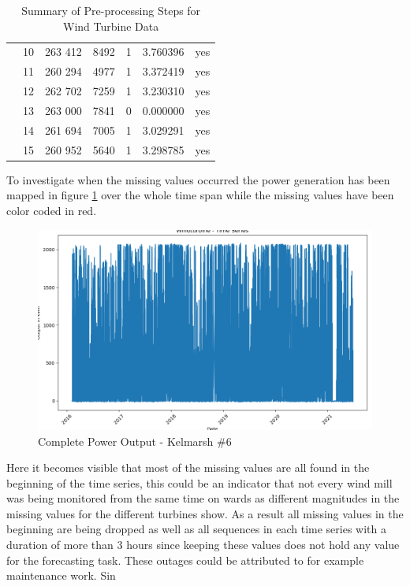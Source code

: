 \documentclass{article}
\begin{document}
\begin{table}[!ht]
\begin{tabular}{l|c|r|r|r|S|r}
            & 10 & 263 412 & 8492 & 1 & 3.760396 & yes \\
            & 11 & 260 294 & 4977 & 1 & 3.372419 & yes \\
            & 12 & 262 702 & 7259 & 1 & 3.230310 & yes \\
            & 13 & 263 000 & 7841 & 0 & 0.000000 & yes \\
            & 14 & 261 694 & 7005 & 1 & 3.029291 & yes \\
            & 15 & 260 952 & 5640 & 1 & 3.298785 & yes \\
    \bottomrule
    \end{tabular}
\caption{Summary of Pre-processing Steps for Wind Turbine Data}
\label{tab:preprocessing_windturbines}
\end{table}

To investigate when the missing values occurred the power generation has been mapped in figure \ref{fig:Kelmarsh-missing-values} over the whole time span while the missing values have been color coded in red.
\begin{figure}
    \centering
    \includegraphics[width=\linewidth]{graphs/Windturbine - Time Series.png}
    \caption{Complete Power Output - Kelmarsh \#6}
    \label{fig:Kelmarsh-missing-values}
\end{figure}

Here it becomes visible that most of the missing values are all found in the beginning of the time series, this could be an indicator that not every wind mill was being monitored from the same time on wards as different magnitudes in the missing values for the different turbines show. As a result all missing values in the beginning are being dropped as well as all sequences in each time series with a duration of more than 3 hours since keeping these values does not hold any value for the forecasting task. These outages could be attributed to for example maintenance work. Sin
\end{document}
